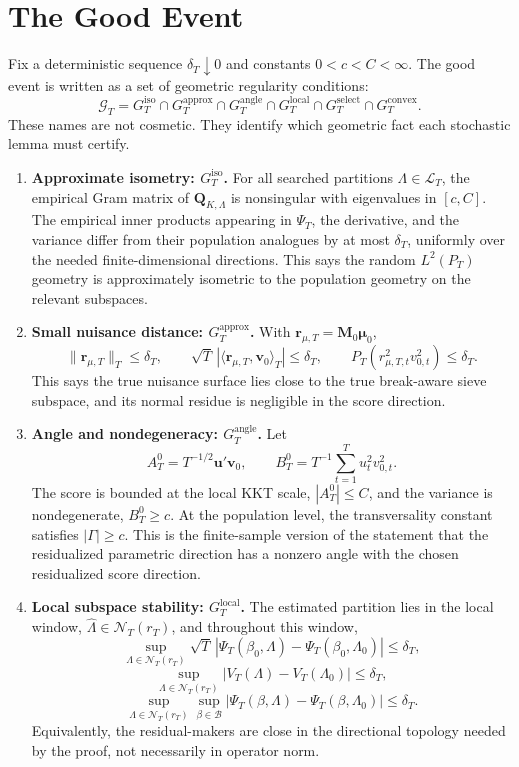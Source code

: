\documentclass[12pt]{article}
\numberwithin{equation}{section}
\theoremstyle{definition}
\newcommand{\innerT}[2]{\langle #1,#2\rangle_T}
\begin{document}
\section{The Good Event}

Fix a deterministic sequence \(\delta_T\downarrow0\) and constants
\(0<c<C<\infty\). The good event is written as a set of geometric regularity
conditions:
\[
    \mathcal G_T
    =G_T^{\mathrm{iso}}
     \cap G_T^{\mathrm{approx}}
     \cap G_T^{\mathrm{angle}}
     \cap G_T^{\mathrm{local}}
     \cap G_T^{\mathrm{select}}
     \cap G_T^{\mathrm{convex}}.
\]
These names are not cosmetic. They identify which geometric fact each
stochastic lemma must certify.

\begin{enumerate}[leftmargin=2em]
\item \textbf{Approximate isometry: \(G_T^{\mathrm{iso}}\).} For all searched
partitions \(\Lambda\in\mathcal L_T\), the empirical Gram matrix of
\(\bm Q_{K,\Lambda}\) is nonsingular with eigenvalues in \([c,C]\). The empirical
inner products appearing in \(\Psi_T\), the derivative, and the variance differ
from their population analogues by at most \(\delta_T\), uniformly over the
needed finite-dimensional directions. This says the random \(L^2(P_T)\) geometry
is approximately isometric to the population geometry on the relevant subspaces.

\item \textbf{Small nuisance distance: \(G_T^{\mathrm{approx}}\).} With
\(\bm r_{\mu,T}=\bm M_0\bm\mu_0\),
\[
    \|\bm r_{\mu,T}\|_T\le \delta_T,
    \qquad
    \sqrt T\,|\innerT{\bm r_{\mu,T}}{\bm v_0}|\le \delta_T,
    \qquad
    P_T(r_{\mu,T,t}^2v_{0,t}^2)\le \delta_T.
\]
This says the true nuisance surface lies close to the true break-aware sieve
subspace, and its normal residue is negligible in the score direction.

\item \textbf{Angle and nondegeneracy: \(G_T^{\mathrm{angle}}\).} Let
\[
    A_T^0=T^{-1/2}\bm u'\bm v_0,
    \qquad
    B_T^0=T^{-1}\sum_{t=1}^T u_t^2v_{0,t}^2.
\]
The score is bounded at the local KKT scale, \(|A_T^0|\le C\), and the variance
is nondegenerate, \(B_T^0\ge c\). At the population level, the transversality
constant satisfies \(|\Gamma|\ge c\). This is the finite-sample version of the
statement that the residualized parametric direction has a nonzero angle with
the chosen residualized score direction.

\item \textbf{Local subspace stability: \(G_T^{\mathrm{local}}\).} The estimated
partition lies in the local window, \(\widehat\Lambda\in\mathcal N_T(r_T)\), and
throughout this window,
\[
    \sup_{\Lambda\in\mathcal N_T(r_T)}
    \sqrt T\,|\Psi_T(\beta_0,\Lambda)-\Psi_T(\beta_0,\Lambda_0)|\le\delta_T,
\]
\[
    \sup_{\Lambda\in\mathcal N_T(r_T)}
    |V_T(\Lambda)-V_T(\Lambda_0)|\le\delta_T,
\]
\[
    \sup_{\Lambda\in\mathcal N_T(r_T)}\sup_{\beta\in\mathcal B}
    |\Psi_T(\beta,\Lambda)-\Psi_T(\beta,\Lambda_0)|\le\delta_T.
\]
Equivalently, the residual-makers are close in the directional topology needed
by the proof, not necessarily in operator norm.


\end{enumerate}
\end{document}
